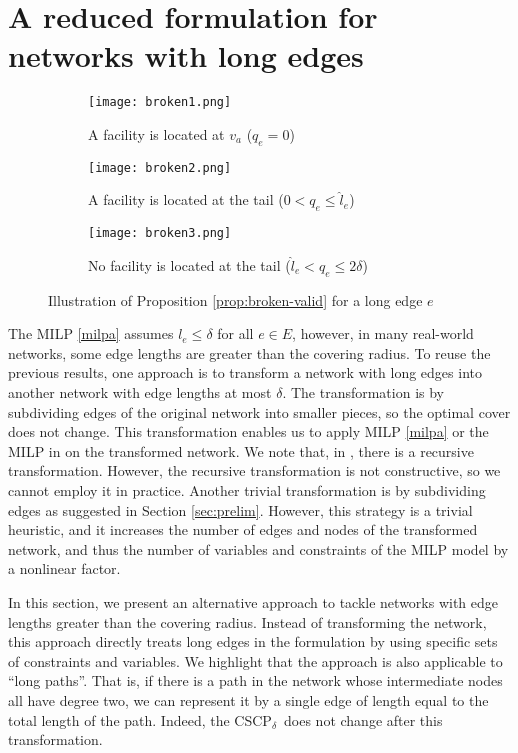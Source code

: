 \documentclass[review]{elsarticle}
\newcommand{\dlt}{{\delta}}
\newcommand{\problem}{CSCP$_\dlt$}
\theoremstyle{definition}
\begin{document}
\section{A reduced formulation for networks with long edges}\label{sec:reduced-milp}
\begin{figure}
	\begin{subfigure}{\textwidth}
    	\centering
    	\texttt{[image: broken1.png]}
    	\caption{A facility is located at $v_a$ ($q_e=0$)}
    	\label{fig:brokena}
	\end{subfigure}
	\vspace{0.25cm}
    
 	\begin{subfigure}{0.45\textwidth}
    	\centering
    	\texttt{[image: broken2.png]}
    	\caption{A facility is located at the tail ($0<q_e\leq \hat{l}_e$)}
    	\label{fig:brokenb}
	\end{subfigure}
	\begin{subfigure}{0.45\textwidth}
    	\centering
    	\texttt{[image: broken3.png]}
    	\caption{No facility is located at the tail ($\hat{l}_e <q_e\leq 2\dlt$)}
    	\label{fig:brokenc}
	\end{subfigure}
	\caption{Illustration of Proposition \ref{prop:broken-valid} for a long edge $e$}
	\label{fig:broken}
\end{figure}

The MILP \eqref{milpa} assumes $l_e \le \dlt$ for all $e \in E$, however, in many real-world networks, some edge lengths are greater than the covering radius. To reuse the previous results, one approach is to transform a network with long edges into another network with edge lengths at most $\dlt$. The transformation is by subdividing edges of the original network into smaller pieces, so the optimal cover does not change. This transformation enables us to apply MILP \eqref{milpa} or the MILP in \cite{Hamacher20} on the transformed network. We note that, in \cite{Hamacher20}, there is a recursive transformation. However, the recursive transformation is not constructive, so we cannot employ it in practice.  Another trivial transformation is by subdividing edges as suggested in Section \ref{sec:prelim}.  However, this strategy is a trivial heuristic, and it increases the number of edges and nodes of the transformed network, and thus the number of variables and constraints of the MILP model by a nonlinear factor.

In this section, we present an alternative approach to tackle networks with edge lengths greater than the covering radius. Instead of transforming the network, this approach directly treats long edges in the formulation by using specific sets of constraints and variables. We highlight that the approach is also applicable to ``long paths''. That is, if there is a path in the network whose  intermediate nodes all have degree two, we can represent it by a single edge of length equal to the total length of the path. Indeed, the \problem\ does not change after this transformation.
\end{document}
